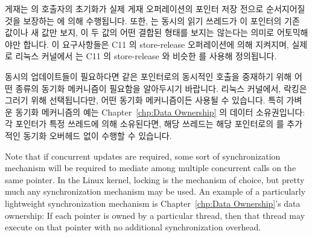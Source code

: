 게재는  의 호출자의 초기화가 실제 게재 오퍼레이션의 포인터 저장
전으로 순서지어질 것을 보장하는  에 의해 수행됩니다.
또한,  는 동시의 읽기 쓰레드가 이 포인터의 기존 값이나
새 값만 보지, 이 두 값의 어떤 결합된 형태를 보지는 않는다는 의미로 어토믹해야만
합니다.
이 요구사항들은 C11 의 store-release 오퍼레이션에 의해 지켜지며, 실제로 리눅스
커널에서  는 C11 의 store-release 와 비슷한
 를 사용해 정의됩니다.

동시의 업데이트들이 필요하다면 같은 포인터로의
동시적인 호출을 중재하기 위해 어떤 종류의 동기화
메커니즘이 필요함을 알아두시기 바랍니다.
리눅스 커널에서, 락킹은 그러기 위해 선택됩니다만, 어떤 동기화 메커니즘이든
사용될 수 있습니다.
특히 가벼운 동기화 메커니즘의 예는
Chapter~\ref{chp:Data Ownership} 의 데이터 소유권입니다: 각 포인터가 특정
쓰레드에 의해 소유된다면, 해당 쓰레드는 해당 포인터로의
 를 추가적인 동기화 오버헤드 없이 수행할 수 있습니다.

\iffalse

Note that if concurrent updates are required, some sort of synchronization
mechanism will be required to mediate among multiple concurrent
 calls on the same pointer.
In the Linux kernel, locking is the mechanism of choice, but pretty
much any synchronization mechanism may be used.
An example of a particularly lightweight synchronization mechanism is
Chapter~\ref{chp:Data Ownership}'s data ownership: If each pointer is
owned by a particular thread, then that thread may execute
 on that pointer with no additional
synchronization overhead.

